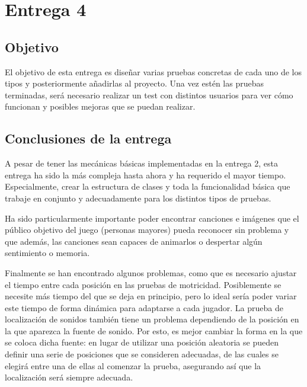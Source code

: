 \section{Entrega 4}


\subsection{Objetivo}

El objetivo de esta entrega es diseñar varias pruebas concretas de cada uno de los tipos y posteriormente añadirlas al proyecto. Una vez estén las pruebas terminadas, será necesario realizar un test con distintos usuarios para ver cómo funcionan y posibles mejoras que se puedan realizar.










\subsection{Conclusiones de la entrega}

A pesar de tener las mecánicas básicas implementadas en la entrega 2, esta entrega ha sido la más compleja hasta ahora y ha requerido el mayor tiempo. Especialmente, crear la estructura de clases y toda la funcionalidad básica que trabaje en conjunto y adecuadamente para los distintos tipos de pruebas. 

Ha sido particularmente importante poder encontrar canciones e imágenes que el público objetivo del juego (personas mayores) pueda reconocer sin problema y que además, las canciones sean capaces de animarlos o despertar algún sentimiento o memoria.

Finalmente se han encontrado algunos problemas, como que es necesario ajustar el tiempo entre cada posición en las pruebas de motricidad. Posiblemente se necesite más tiempo del que se deja en principio, pero lo ideal sería poder variar este tiempo de forma dinámica para adaptarse a cada jugador. La prueba de localización de sonidos también tiene un problema dependiendo de la posición en la que aparezca la fuente de sonido. Por esto, es mejor cambiar la forma en la que se coloca dicha fuente: en lugar de utilizar una posición aleatoria se pueden definir una serie de posiciones que se consideren adecuadas, de las cuales se elegirá entre una de ellas al comenzar la prueba, asegurando así que la localización será siempre adecuada.



